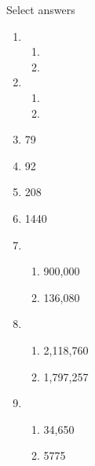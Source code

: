 \documentclass{article}
\begin{document}
\newpage

Select answers\bigskip
\begin{enumerate}
    \item 
    \begin{enumerate}
        \item 
        \item 
    \end{enumerate}
    
    \item 
    \begin{enumerate}
        \item 
        \item 
    \end{enumerate}
    
    \item 79
    
    \item 92
    
    \item 208
    
    \item 1440
    
    \item 
    \begin{enumerate}
        \item 900,000
        \item 136,080
    \end{enumerate}
    
    \item
    \begin{enumerate}
        \item 2,118,760
        \item 1,797,257
    \end{enumerate}
    
    \item 
    \begin{enumerate}
        \item 34,650
        \item 5775
    \end{enumerate}
\end{enumerate}
\end{document}
